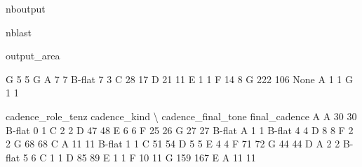 \documentclass[letterpaper,10pt,english]{sphinxmanual}
\begin{document}
\begin{sphinxuseclass}{nboutput}
\begin{sphinxuseclass}{nblast}
{\begin{sphinxuseclass}{output_area}
\begin{sphinxuseclass}{}
\begin{sphinxVerbatim}[commandchars=\\\{\}]
                   G                               5              5
G                  A                               7              7
                   B-flat                          7              3
                   C                              28             17
                   D                              21             11
                   E                               1              1
                   F                              14              8
                   G                             222            106
None               A                               1              1
                   G                               1              1

                                  cadence\_role\_tenz  cadence\_kind  \textbackslash{}
cadence\_final\_tone final\_cadence
A                  A                             30            30
                   B-flat                         0             1
                   C                              2             2
                   D                             47            48
                   E                              6             6
                   F                             25            26
                   G                             27            27
B-flat             A                              1             1
                   B-flat                         4             4
                   D                              8             8
                   F                              2             2
                   G                             68            68
C                  A                             11            11
                   B-flat                         1             1
                   C                             51            54
                   D                              5             5
                   E                              4             4
                   F                             71            72
                   G                             44            44
D                  A                              2             2
                   B-flat                         5             6
                   C                              1             1
                   D                             85            89
                   E                              1             1
                   F                             10            11
                   G                            159           167
E                  A                             11            11

\end{sphinxVerbatim}
\end{sphinxuseclass}
\end{sphinxuseclass}}
\end{sphinxuseclass}
\end{sphinxuseclass}
\end{document}
